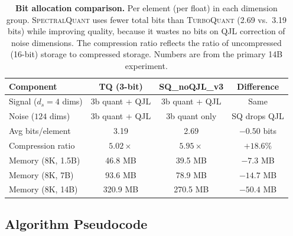 \documentclass[11pt]{article}
\newcommand{\TQ}{\textsc{TurboQuant}}
\newcommand{\SQ}{\textsc{SpectralQuant}}
\begin{document}
\begin{table}[!htbp]
\centering
\caption{\textbf{Bit allocation comparison.}  Per element (per float) in each
dimension group.  \SQ{} uses fewer total bits than \TQ{} (2.69 vs.\ 3.19 bits)
while improving quality, because it wastes no bits on QJL correction of noise
dimensions.  The compression ratio reflects the ratio of uncompressed (16-bit)
storage to compressed storage.  Numbers are from the primary 14B experiment.}
\label{tab:bits}
\footnotesize
\begin{tabular}{lccc}
\toprule
\textbf{Component} & \textbf{TQ (3-bit)} & \textbf{SQ\_noQJL\_v3} & \textbf{Difference} \\
\midrule
Signal ($d_s = 4$ dims)  & 3b quant + QJL & 3b quant + QJL & Same \\
Noise ($124$ dims)       & 3b quant + QJL & 3b quant only  & SQ drops QJL \\
\midrule
Avg bits/element & 3.19 & 2.69 & $-0.50$ bits \\
Compression ratio & $5.02\times$ & $5.95\times$ & $+18.6\%$ \\
\midrule
Memory (8K, 1.5B) & 46.8 MB & 39.5 MB & $-7.3$ MB \\
Memory (8K, 7B)   & 93.6 MB & 78.9 MB & $-14.7$ MB \\
Memory (8K, 14B)  & 320.9 MB & 270.5 MB & $-50.4$ MB \\
\bottomrule
\end{tabular}
\end{table}

\subsection{Algorithm Pseudocode}
\label{subsec:pseudocode}
\end{document}
